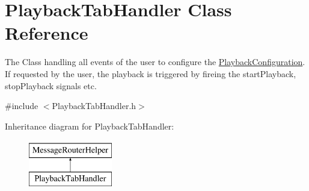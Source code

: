 \hypertarget{class_playback_tab_handler}{}\section{Playback\+Tab\+Handler Class Reference}
\label{class_playback_tab_handler}


The Class handling all events of the user to configure the \hyperlink{class_playback_configuration}{Playback\+Configuration}. If requested by the user, the playback is triggered by fireing the start\+Playback, stop\+Playback signals etc.  




{\ttfamily \#include $<$Playback\+Tab\+Handler.\+h$>$}

Inheritance diagram for Playback\+Tab\+Handler\+:\begin{figure}[H]
\begin{center}
\leavevmode
\includegraphics[height=2.000000cm]{class_playback_tab_handler}
\end{center}
\end{figure}
